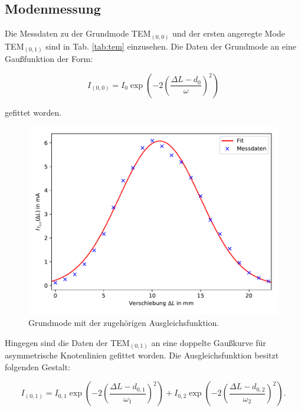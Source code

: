 \FloatBarrier

\subsection{Modenmessung}
\label{sec:tem}

Die Messdaten zu der Grundmode TEM$_{(0,0)}$ und der ersten angeregte Mode
TEM$_{(0,1)}$ sind in Tab. \ref{tab:tem} einzusehen.
Die Daten der Grundmode  an eine Gaußfunktion der Form:

\begin{equation}
  \label{eqn:gauß}
  I_{(0, 0)} = I_0\exp\left(-2\left(\frac{\Delta L - d_0}{\omega}\right)^2\right)
\end{equation}

gefittet worden.

\begin{figure}[h]
  \centering
  \includegraphics[width = \textwidth]{Pics/Grundmode.pdf}
  \caption{Grundmode mit der zugehörigen Ausgleichsfunktion.}
  \label{fig:Grundmode}
\end{figure}

Hingegen sind die Daten der TEM$_{(0,1)}$ an eine doppelte Gaußkurve
für asymmetrische Knotenlinien gefittet worden.
Die Ausgleichsfunktion besitzt folgenden Gestalt:

\begin{equation}
  \label{eqn:doppelter_gauß}
  I_{(0, 1)} = I_{0,1}\exp\left(-2\left(\frac{\Delta L - d_{0,1}}{\omega_1}\right)^2\right)
  + I_{0,2}\exp\left(-2\left(\frac{\Delta L - d_{0,2}}{\omega_2}\right)^2\right).
\end{equation}


